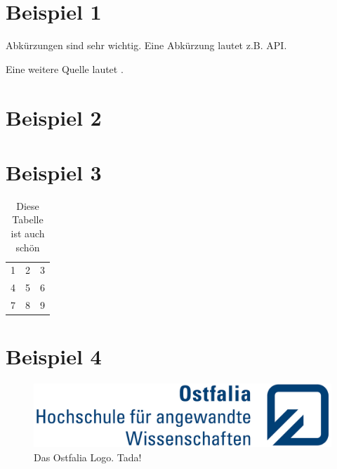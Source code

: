 \chapter{Beispiel 1}
Abkürzungen sind sehr wichtig.
Eine Abkürzung lautet z.B. \ac{API}.

Eine weitere Quelle lautet \cite{Prevezanos2013}.

\Blindtext

\chapter{Beispiel 2}
\blindtext

\chapter{Beispiel 3}
\blindtext

\begin{table}[H]
	\begin{center}
		\begin{tabular}{| l c r |}
			\hline
			1 & 2 & 3 \\
			4 & 5 & 6 \\
			7 & 8 & 9 \\
			\hline
		\end{tabular}
	\end{center}
	\caption{Diese Tabelle ist auch schön}
\end{table}

\blindtext

\chapter{Beispiel 4}
\blindtext

\begin{figure}[H]
	\begin{center}
		\includegraphics{Bilder/ostfalia_logo.jpg}
		\caption{Das Ostfalia Logo. Tada!}
	\end{center}
\end{figure}

\blindtext
